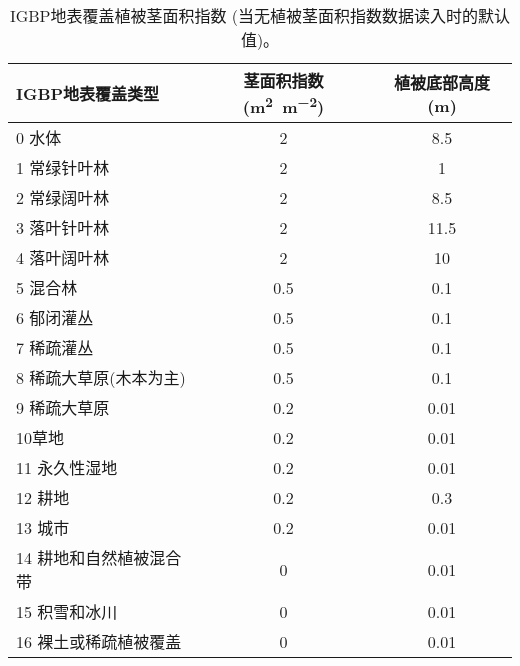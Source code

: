 \begin{table}[htbp]
    \centering
    \caption{IGBP地表覆盖植被茎面积指数 (当无植被茎面积指数数据读入时的默认值)。}
    \label{tab:IGBP地表覆盖植被茎面积指数}
\begin{tabular}{@{}lcc@{}}
\toprule
IGBP地表覆盖类型    & 茎面积指数 (\unit{m^2.m^{-2}}) & 植被底部高度 (m) \\ \midrule
0 水体          & 2                   & 8.5                 \\
1 常绿针叶林       & 2                   & 1                   \\
2 常绿阔叶林       & 2                   & 8.5                 \\
3 落叶针叶林       & 2                   & 11.5                \\
4 落叶阔叶林       & 2                   & 10                  \\
5 混合林         & 0.5                 & 0.1                 \\
6 郁闭灌丛        & 0.5                 & 0.1                 \\
7 稀疏灌丛        & 0.5                 & 0.1                 \\
8 稀疏大草原(木本为主) & 0.5                 & 0.1                 \\
9 稀疏大草原       & 0.2                 & 0.01                \\
10草地          & 0.2                 & 0.01                \\
11 永久性湿地      & 0.2                 & 0.01                \\
12 耕地         & 0.2                 & 0.3                 \\
13 城市         & 0.2                 & 0.01                \\
14 耕地和自然植被混合带 & 0                   & 0.01                \\
15 积雪和冰川      & 0                   & 0.01                \\
16 裸土或稀疏植被覆盖  & 0                   & 0.01                \\ \bottomrule
\end{tabular}
\end{table}

